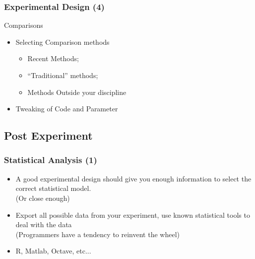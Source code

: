 \documentclass{beamer}
\begin{document}
\begin{frame}
  \frametitle{Experimental Design (4)}
  \begin{block}{Comparisons}
    \begin{itemize}
      \item Selecting Comparison methods
        \begin{itemize}
        \item Recent Methods;
        \item ``Traditional'' methods;
        \item \alert<2>{Methods Outside your discipline}
        \end{itemize}
      \item Tweaking of Code and Parameter
    \end{itemize}
  \end{block}
\end{frame}



\subsection{Post Experiment}
\begin{frame}
  \frametitle{Statistical Analysis (1)}
  \begin{block}{}
    \begin{itemize}
    \item A good experimental design should give you enough
      information to select the correct statistical
      model.\\ {\tiny (Or close enough)}
      \medskip

    \item Export all possible data from your experiment, use known
      statistical tools to deal with the data\\ {\tiny (Programmers
        have a tendency to reinvent the wheel)}
      \medskip

    \item R, Matlab, Octave, etc...
    \end{itemize}    
  \end{block}
\end{frame}
\end{document}
